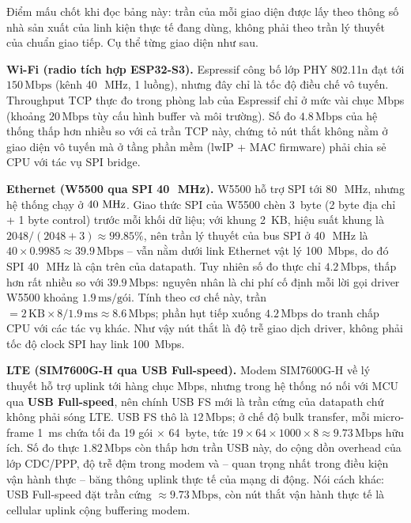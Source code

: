 Điểm mấu chốt khi đọc bảng này: trần của mỗi giao diện được lấy theo thông số nhà sản xuất của linh kiện thực tế đang dùng, không phải theo trần lý thuyết của chuẩn giao tiếp. Cụ thể từng giao diện như sau.

\textbf{Wi-Fi (radio tích hợp ESP32-S3).} Espressif công bố lớp PHY 802.11n đạt tới $150\,\text{Mbps}$ (kênh 40~\,MHz, 1 luồng), nhưng đây chỉ là tốc độ điều chế vô tuyến. Throughput TCP thực đo trong phòng lab của Espressif chỉ ở mức vài chục Mbps (khoảng $20\,\text{Mbps}$ tùy cấu hình buffer và môi trường). Số đo $4{.}8\,\text{Mbps}$ của hệ thống thấp hơn nhiều so với cả trần TCP này, chứng tỏ nút thắt không nằm ở giao diện vô tuyến mà ở tầng phần mềm (lwIP + MAC firmware) phải chia sẻ CPU với tác vụ SPI bridge.

\textbf{Ethernet (W5500 qua SPI 40~\,MHz).} W5500 hỗ trợ SPI tới 80~\,MHz, nhưng hệ thống chạy ở $40\,\text{\,MHz}$. Giao thức SPI của W5500 chèn 3~byte (2 byte địa chỉ + 1 byte control) trước mỗi khối dữ liệu; với khung 2~KB, hiệu suất khung là $2048/(2048+3) \approx 99{.}85\%$, nên trần lý thuyết của bus SPI ở 40~\,MHz là $40 \times 0{.}9985 \approx 39{.}9\,\text{Mbps}$ -- vẫn nằm dưới link Ethernet vật lý 100~Mbps, do đó SPI 40~\,MHz là cận trên của datapath. Tuy nhiên số đo thực chỉ $4{.}2\,\text{Mbps}$, thấp hơn rất nhiều so với $39{.}9\,\text{Mbps}$: nguyên nhân là chi phí cố định mỗi lời gọi driver W5500 khoảng $1{.}9\,\text{ms/gói}$. Tính theo cơ chế này, trần $= 2\,\text{KB}\times8 / 1{.}9\,\text{ms} \approx 8{.}6\,\text{Mbps}$; phần hụt tiếp xuống $4{.}2\,\text{Mbps}$ do tranh chấp CPU với các tác vụ khác. Như vậy nút thắt là độ trễ giao dịch driver, không phải tốc độ clock SPI hay link 100~Mbps.

\textbf{LTE (SIM7600G-H qua USB Full-speed).} Modem SIM7600G-H về lý thuyết hỗ trợ uplink tới hàng chục Mbps, nhưng trong hệ thống nó nối với MCU qua \textbf{USB Full-speed}, nên chính USB FS mới là trần cứng của datapath chứ không phải sóng LTE. USB FS thô là $12\,\text{Mbps}$; ở chế độ bulk transfer, mỗi micro-frame 1~ms chứa tối đa 19 gói $\times$ 64~byte, tức $19\times64\times1000\times8 \approx 9{.}73\,\text{Mbps}$ hữu ích. Số đo thực $1{.}82\,\text{Mbps}$ còn thấp hơn trần USB này, do cộng dồn overhead của lớp CDC/PPP, độ trễ đệm trong modem và -- quan trọng nhất trong điều kiện vận hành thực -- băng thông uplink thực tế của mạng di động. Nói cách khác: USB Full-speed đặt trần cứng $\approx 9{.}73\,\text{Mbps}$, còn nút thắt vận hành thực tế là cellular uplink cộng buffering modem.

